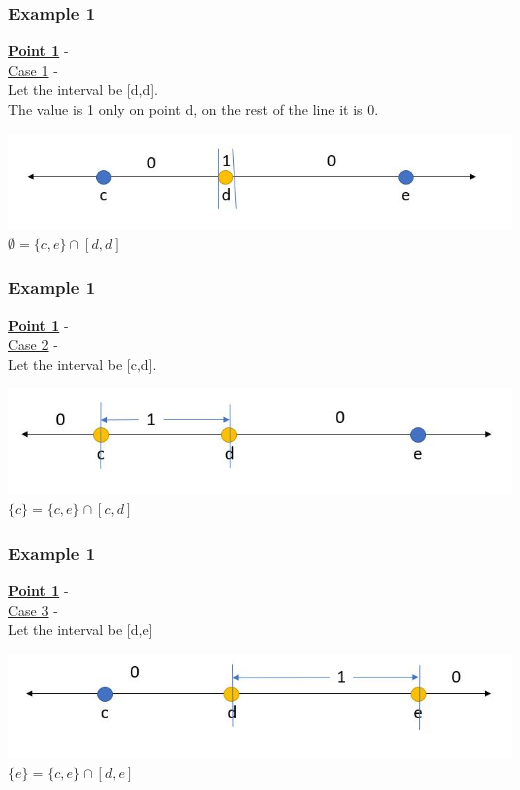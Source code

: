 \documentclass{beamer}
\begin{document}
\begin{frame}
\frametitle{Example 1}
\textbf{\underline{Point 1}} -\\
\underline{Case 1} - \\
Let the interval be [d,d].\\
The value is 1 only on point d, on the rest of the line it is 0.
\begin{center}
    \includegraphics[scale = 0.5]{figures/Capture2.JPG}\\
    $\emptyset = \{c,e\} \cap [d,d]$
\end{center}
\end{frame}

\begin{frame}
\frametitle{Example 1}
\item \textbf{\underline{Point 1}} -\\
\underline{Case 2} - \\
Let the interval be [c,d].
\begin{center}
    \includegraphics[scale = 0.5]{figures/Capture3.JPG}\\
    $\{c\} = \{c,e\} \cap [c,d]$
\end{center}
\end{frame}

\begin{frame}
\frametitle{Example 1}
\item \textbf{\underline{Point 1}} -\\
\underline{Case 3} - \\
Let the interval be [d,e]
\begin{center}
    \includegraphics[scale = 0.5]{figures/Capture4.JPG}\\
    $\{e\} = \{c,e\} \cap [d,e]$
\end{center}
\end{frame}
\end{document}
